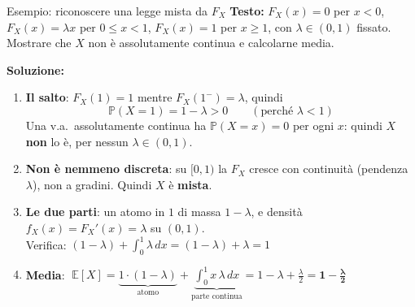 \documentclass[12pt]{extarticle} %
\begin{document}
\begin{eserciziobox}{{Esempio: riconoscere una legge mista da $F_X$}}
\textbf{Testo:} $F_X(x) = 0$ per $x<0$, \; $F_X(x) = \lambda x$ per $0 \le x < 1$, \; $F_X(x) = 1$ per $x \ge 1$, con $\lambda \in (0,1)$ fissato. Mostrare che $X$ non è assolutamente continua e calcolarne media.
\par\textbf{Soluzione:}
\begin{enumerate}
    \item \textbf{Il salto}: $F_X(1) = 1$ mentre $F_X(1^-) = \lambda$, quindi
    $$ \mathbb{P}(X = 1) = 1 - \lambda > 0 \qquad (\text{perché } \lambda < 1) $$
    Una v.a.\ assolutamente continua ha $\mathbb{P}(X = x) = 0$ per ogni $x$: quindi $X$ \textbf{non} lo è, per nessun $\lambda \in (0,1)$.
    \item \textbf{Non è nemmeno discreta}: su $[0,1)$ la $F_X$ cresce con continuità (pendenza $\lambda$), non a gradini. Quindi $X$ è \textbf{mista}.
    \item \textbf{Le due parti}: un atomo in $1$ di massa $1-\lambda$, e densità $f_X(x) = F_X'(x) = \lambda$ su $(0,1)$. \\ Verifica: $(1-\lambda) + \int_0^1 \lambda\,dx = (1-\lambda) + \lambda = 1$ \checkmark
    \item \textbf{Media}: $\;\mathbb{E}[X] = \underbrace{1 \cdot (1-\lambda)}_{\text{atomo}} + \underbrace{\int_0^1 x\,\lambda\,dx}_{\text{parte continua}} = 1 - \lambda + \frac{\lambda}{2} = \mathbf{1 - \frac{\lambda}{2}}$
\end{enumerate}
\end{eserciziobox}
\end{document}
